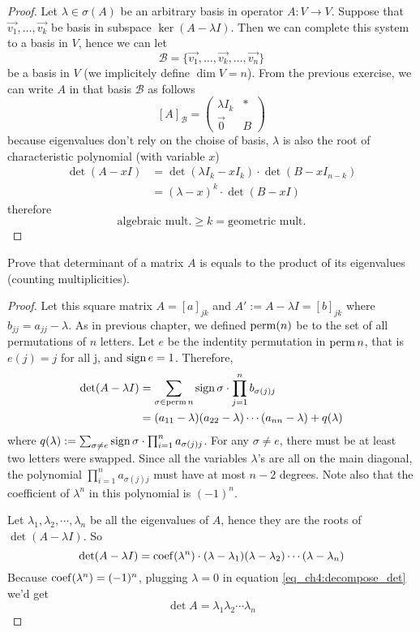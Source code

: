 \documentclass{article}
\begin{document}
\begin{proof}
  Let $\lambda\in\sigma(A)$ be an arbitrary basis in operator 
  $A:V\to V$. Suppose that $\vec{v_1},\dots,\vec{v_k}$ be basis 
  in subspace $\ker(A-\lambda I)$. Then we can complete this 
  system to a basis in $V$, hence we can let 
  \[
    \mathcal B=\{\vec{v_1},\dots,\vec{v_k},\dots, \vec{v_n}\}
  \]
  be a basis in $V$ (we implicitely define $\dim V=n$). From the previous
  exercise, we can write $A$ in that basis $\mathcal B$ as follows
  \[
    [A]_{\mathcal B}=
    \begin{pmatrix}
      \lambda I_k&*\\\vec{0}&B
    \end{pmatrix}
  \]
  because eigenvalues don't rely on the choise of basis, $\lambda$ is
  also the root of characteristic polynomial (with variable $x$)
  \begin{align*}
    \det(A-xI)
    &=\det(\lambda I_k-xI_k)\cdot\det(B-xI_{n-k})\\
    &=(\lambda-x)^k \cdot\det(B-xI)
  \end{align*}
  therefore
  \[
    \boxed{\text{algebraic mult.}\geq k=\text{geometric mult.}}
  \]
\end{proof}
\newpage
\begin{exercise}
  Prove that determinant of a matrix $A$ is equals to the
  product of its eigenvalues (counting multiplicities).
\end{exercise}
\begin{proof}
  Let this square matrix $A=[a]_{jk}$ and  
  $A':=A-\lambda I=[b]_{jk}$ where $b_{jj}=a_{jj}-\lambda$.
  As in previous chapter, we defined $\operatorname{perm}(n)$ be to the set of
  all permutations of $n$ letters. Let $e$ be the indentity
  permutation in $\operatorname{perm}{n}$, that is $e(j)=j$ for all j, and 
  $\operatorname{sign} e=1$. Therefore,
  \begin{align}
    \label{eq_ch4:decompose_det}
    \det(A-\lambda I)
    &=\sum_{\sigma\in\operatorname{perm} n}\operatorname{sign}\sigma\cdot
    \prod_{j=1}^{n}b_{\sigma(j)j}\notag\\
    &=(a_{11}-\lambda)(a_{22}-\lambda)\cdots(a_{nn}-\lambda)+q(\lambda)
  \end{align}
  where $q(\lambda):=\sum_{\sigma\neq e}\operatorname{sign}\sigma
  \cdot\prod_{i=1}^{n}a_{\sigma(j)j}$. For any $\sigma\neq e$,
  there must be at least two letters were swapped. Since all the 
  variables $\lambda$'s are all on the main diagonal, the polynomial
  $\prod_{i=1}^{n}a_{\sigma(j)j}$ must have at most $n-2$ degrees.
  Note also that the coefficient of $\lambda^n$ in this polynomial
  is $(-1)^n$.

  Let $\lambda_1,\lambda_2,\cdots,\lambda_n$ be all the eigenvalues of
  $A$, hence they are the roots of $\det(A-\lambda I)$. So
  \begin{equation}
    \label{eq_ch4:factor_det}
    \det(A-\lambda I)=\operatorname{coef}(\lambda^n)\cdot 
    (\lambda-\lambda_1)(\lambda-\lambda_2)\cdots(\lambda-\lambda_n)
  \end{equation}
  Because $\operatorname{coef}(\lambda^n)=(-1)^n$, plugging $\lambda=0$ in equation
  \eqref{eq_ch4:decompose_det} we'd get
  \[
    \boxed{\det A=\lambda_1\lambda_2\cdots\lambda_n}
  \]
\end{proof}
\end{document}
